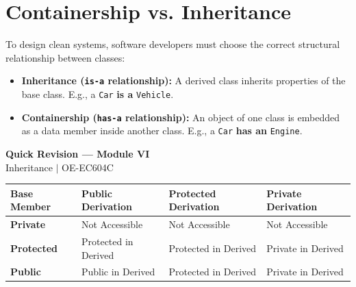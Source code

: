 \documentclass[12pt,a4paper]{article}
\renewcommand{\arraystretch}{1.45}
\begin{document}
\section{Containership vs. Inheritance}

To design clean systems, software developers must choose the correct structural relationship between classes:
\begin{itemize}[leftmargin=*, itemsep=3pt]
  \item \textbf{Inheritance (\texttt{is-a} relationship):} A derived class inherits properties of the base class. E.g., a \texttt{Car} \textbf{is a} \texttt{Vehicle}.
  \item \textbf{Containership (\texttt{has-a} relationship):} An object of one class is embedded as a data member inside another class. E.g., a \texttt{Car} \textbf{has an} \texttt{Engine}.
\end{itemize}

\newpage
\begin{center}
  {\large\bfseries\color{myred} Quick Revision --- Module VI}\\[3pt]
  {\small\color{mydark} Inheritance $|$ OE-EC604C}
\end{center}
\noindent{\color{myred}\rule{\linewidth}{1.2pt}}
\vspace{4pt}

\begin{tcolorbox}[formulabox, title={\textbf{Access Control Table under Derivation}}]
\renewcommand{\arraystretch}{1.3}
\par\noindent
\begin{tabularx}{\linewidth}{|B{2.8cm}|Y|Y|Y|}
\hline
\textbf{Base Member} & \textbf{Public Derivation} & \textbf{Protected Derivation} & \textbf{Private Derivation} \\
\hline
\textbf{Private}     & Not Accessible & Not Accessible & Not Accessible \\
\hline
\textbf{Protected}   & Protected in Derived & Protected in Derived & Private in Derived \\
\hline
\textbf{Public}      & Public in Derived & Protected in Derived & Private in Derived \\
\hline
\end{tabularx}
\end{tcolorbox}
\end{document}
